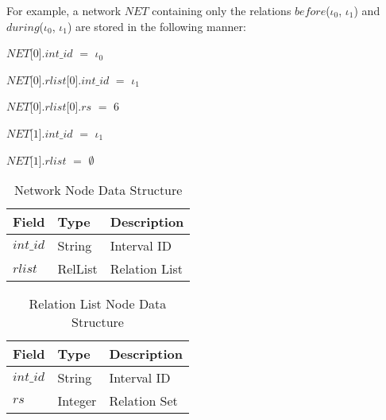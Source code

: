 \documentclass[11pt]{report}
\newenvironment{vquote}
{
  \begin{list}{}{\leftmargin 1em}\item[]
}
{
  \end{list}
}
\begin{document}
          For example, a network $NET$ containing only the relations
          $before$($\iota_0$, $\iota_1$) and $during$($\iota_0$, $\iota_1$) are
          stored in the following manner:

          \begin{vquote}
            $NET$[$0$].$int\_id$ $=$ $\iota_0$

            $NET$[$0$].$rlist$[$0$].$int\_id$ $=$ $\iota_1$

            $NET$[$0$].$rlist$[$0$].$rs$ $=$ $6$

            $NET$[$1$].$int\_id$ $=$ $\iota_1$

            $NET$[$1$].$rlist$ $=$ $\emptyset$
          \end{vquote}

          \begin{table}[tbhp]
            \begin{center}
              \begin{tabular}[t]{|l|l|l|}
                \hline
                {\bf Field} & {\bf Type} & {\bf Description} \\
                \hline
                $int\_id$ & String & Interval ID \\
                \hline
                $rlist$   & RelList & Relation List \\
                \hline
              \end{tabular}
            \end{center}
            \caption{Network Node Data Structure}
            \label{tabl-impln-nwdsr}
          \end{table}

          \begin{table}[tbhp]
            \begin{center}
              \begin{tabular}[t]{|l|l|l|}
                \hline
                {\bf Field} & {\bf Type} & {\bf Description} \\
                \hline
                $int\_id$ & String & Interval ID \\
                \hline
                $rs$      & Integer & Relation Set \\
                \hline
              \end{tabular}
            \end{center}
            \caption{Relation List Node Data Structure}
            \label{tabl-impln-rldsr}
          \end{table}
\end{document}
